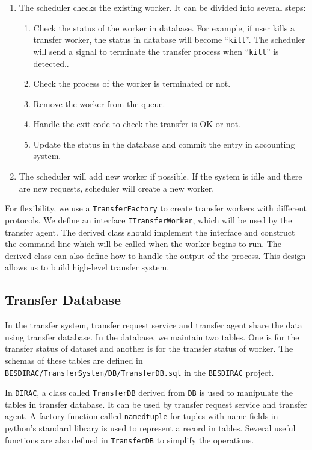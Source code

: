 \begin{enumerate}
\item The scheduler checks the existing worker.
It can be divided into several steps:
\begin{enumerate}
    \item Check the status of the worker in database.
          For example, if user kills a transfer worker, the status in
          database will become ``\verb"kill"''.
          The scheduler will
          send a signal to terminate the
          transfer process when ``\verb"kill"'' is detected..
    \item Check the process of the worker is terminated or not.
    \item Remove the worker from the queue.
    \item Handle the exit code to check the transfer is OK or not.
    \item Update the status in the database 
          and commit the entry in accounting system.
\end{enumerate}
\item The scheduler will add new worker if possible.
If the system is idle and there are new requests,
scheduler will create a new worker.
\end{enumerate}
For flexibility, we use a {\tt TransferFactory} to create transfer workers
with different protocols. 
We define an interface {\tt ITransferWorker},
which will be used by the transfer agent. The derived class should
implement the interface and construct the command line which will 
be called when the worker begins to run.
The derived class can also define how to handle the output of the 
process.
This design allows us to build high-level transfer system.

\subsection{Transfer Database}

In the transfer system, transfer request service and transfer agent
share the data using transfer database. In the database, we maintain
two tables.
One is for the transfer status of dataset 
and another is for the transfer status of worker. 
The schemas of these tables are defined 
in {\tt BESDIRAC/TransferSystem/DB/TransferDB.sql} in the {\tt BESDIRAC}
project\cite{bib:besdirac}.

In {\tt DIRAC}, a class called {\tt TransferDB} 
derived from {\tt DB} is used to manipulate
the tables in transfer database.
It can be used by transfer request 
service and transfer agent. A factory function called \verb"namedtuple" 
for tuples with name fields
in python's standard library
is used to represent a record in tables.
Several useful functions are also defined in {\tt TransferDB}
to simplify the operations.
